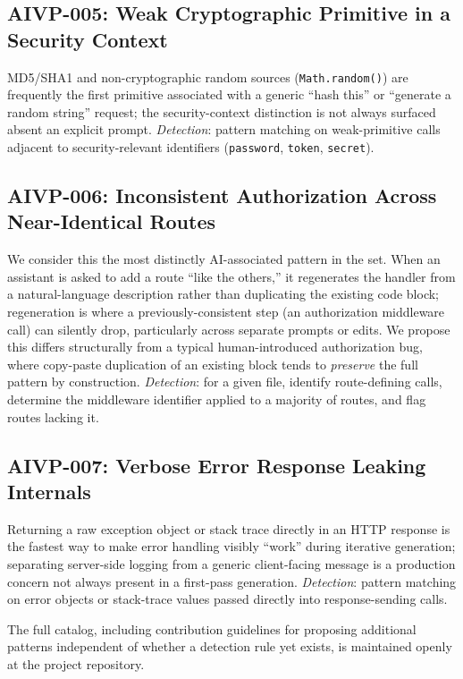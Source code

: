 \documentclass[11pt]{article}
\begin{document}
\subsection*{AIVP-005: Weak Cryptographic Primitive in a Security Context}
MD5/SHA1 and non-cryptographic random sources (\texttt{Math.random()})
are frequently the first primitive associated with a generic
``hash this'' or ``generate a random string'' request; the
security-context distinction is not always surfaced absent an explicit
prompt. \emph{Detection}: pattern matching on weak-primitive calls
adjacent to security-relevant identifiers (\texttt{password},
\texttt{token}, \texttt{secret}).

\subsection*{AIVP-006: Inconsistent Authorization Across Near-Identical Routes}
We consider this the most distinctly AI-associated pattern in the set.
When an assistant is asked to add a route ``like the others,'' it
regenerates the handler from a natural-language description rather than
duplicating the existing code block; regeneration is where a
previously-consistent step (an authorization middleware call) can
silently drop, particularly across separate prompts or edits. We propose
this differs structurally from a typical human-introduced authorization
bug, where copy-paste duplication of an existing block tends to
\emph{preserve} the full pattern by construction. \emph{Detection}: for a
given file, identify route-defining calls, determine the middleware
identifier applied to a majority of routes, and flag routes lacking it.

\subsection*{AIVP-007: Verbose Error Response Leaking Internals}
Returning a raw exception object or stack trace directly in an HTTP
response is the fastest way to make error handling visibly ``work'' during
iterative generation; separating server-side logging from a generic
client-facing message is a production concern not always present in a
first-pass generation. \emph{Detection}: pattern matching on error
objects or stack-trace values passed directly into response-sending
calls.

\medskip
\noindent The full catalog, including contribution guidelines for
proposing additional patterns independent of whether a detection rule
yet exists, is maintained openly at the project repository.
\end{document}
